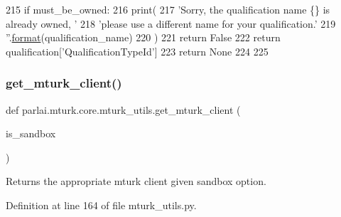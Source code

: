 \begin{DoxyCode}
215             \textcolor{keywordflow}{if} must\_be\_owned:
216                 print(
217                     \textcolor{stringliteral}{'Sorry, the qualification name \{\} is already owned, '}
218                     \textcolor{stringliteral}{'please use a different name for your qualification.'}
219                     \textcolor{stringliteral}{''}.\hyperlink{namespaceparlai_1_1chat__service_1_1services_1_1messenger_1_1shared__utils_a32e2e2022b824fbaf80c747160b52a76}{format}(qualification\_name)
220                 )
221                 \textcolor{keywordflow}{return} \textcolor{keyword}{False}
222             \textcolor{keywordflow}{return} qualification[\textcolor{stringliteral}{'QualificationTypeId'}]
223     \textcolor{keywordflow}{return} \textcolor{keywordtype}{None}
224 
225 
\end{DoxyCode}
\mbox{\label{namespaceparlai_1_1mturk_1_1core_1_1mturk__utils_a577e2527c04682284394b0951a090695}} 
\subsubsection{\texorpdfstring{get\+\_\+mturk\+\_\+client()}{get\_mturk\_client()}}
{\footnotesize\ttfamily def parlai.\+mturk.\+core.\+mturk\+\_\+utils.\+get\+\_\+mturk\+\_\+client (\begin{DoxyParamCaption}\item[{}]{is\+\_\+sandbox }\end{DoxyParamCaption})}

\begin{DoxyVerb}Returns the appropriate mturk client given sandbox option.
\end{DoxyVerb}
 

Definition at line 164 of file mturk\+\_\+utils.\+py.



